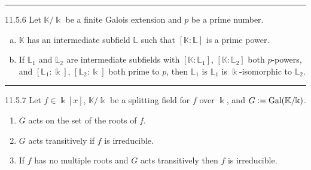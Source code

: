 \documentclass[a4paper, 12pt]{article}
\begin{document}
\noindent\rule{7in}{2.8pt}
\begin{problem}{11.5.6}
Let \(\mathbb{K}/\Bbbk\) be a finite Galois extension and \(p\) be a prime number. 
\begin{enumerate}[(a)]
\item \(\mathbb{K}\) has an intermediate subfield \(\mathbb{L}\) such that \([\mathbb{K}:\mathbb{L}]\) is a prime power. 
\item If \(\mathbb{L}_1\) and \(\mathbb{L_2}\) are intermediate subfields with \([\mathbb{K}:\mathbb{L}_1]\), \([\mathbb{K}:\mathbb{L}_2]\) both 
\(p\)-powers, and \([\mathbb{L}_1:\Bbbk]\), \([\mathbb{L}_2:\Bbbk]\) both prime to \(p\), then \(\mathbb{L}_1\) is \(\mathbb{L}_1\) is \(\Bbbk\)-isomorphic to \(\mathbb{L}_2\).
\end{enumerate}
\end{problem}
\begin{solution}
    
\end{solution}

\noindent\rule{7in}{2.8pt}
\begin{problem}{11.5.7}
Let \(f\in \Bbbk[x]\), \(\mathbb{K}/\Bbbk\) be a splitting field for \(f\) over \(\Bbbk\), and \(G:=\text{Gal}(\mathbb{K}/\Bbbk)\).
\begin{enumerate}
\item \(G\) acts on the set of the roots of \(f\).
\item \(G\) acts transitively if \(f\) is irreducible. 
\item If \(f\) has no multiple roots and \(G\) acts transitively then \(f\) is irreducible.
\end{enumerate}
\end{problem}
\begin{solution}
    
\end{solution}
\end{document}

